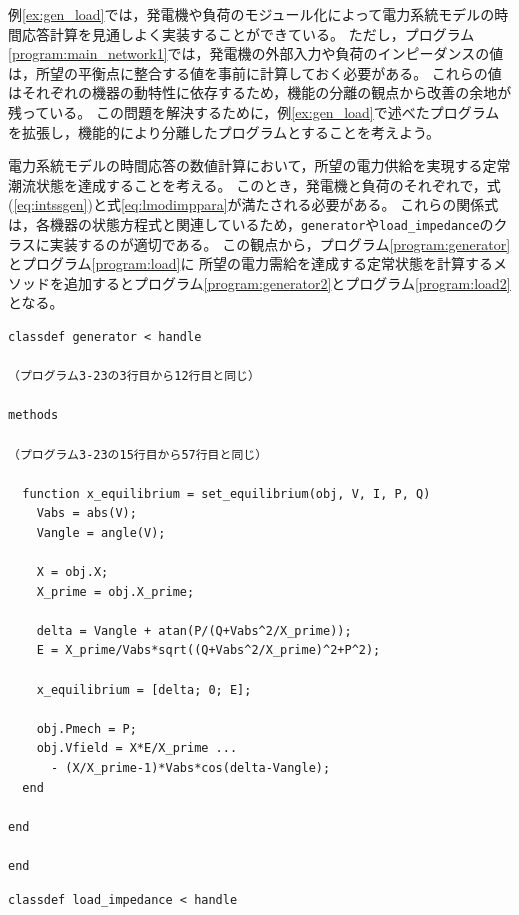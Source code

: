 \documentclass[tombow,dvipdfmx]{corona-a5-1.1}
\begin{document}
例\ref{ex:gen_load}では，発電機や負荷のモジュール化によって電力系統モデルの時間応答計算を見通しよく実装することができている。
ただし，プログラム\nobreak\ref{program:main_network1}では，発電機の外部入力や負荷のインピーダンスの値は，所望の平衡点に整合する値を事前に計算しておく必要がある。
これらの値はそれぞれの機器の動特性に依存するため，機能の分離の観点から改善の余地が残っている。
この問題を解決するために，例\ref{ex:gen_load}で述べたプログラムを拡張し，機能的により分離したプログラムとすることを考えよう。


\begin{例}[発電機や負荷の定常状態を計算するメソッドの追加]
電力系統モデルの時間応答の数値計算において，所望の電力供給を実現する定常潮流状態を達成することを考える。
このとき，発電機と負荷のそれぞれで，式(\ref{eq:intssgen})と式\ref{eq:lmodimppara}が満たされる必要がある。
これらの関係式は，各機器の状態方程式と関連しているため，\verb|generator|や\verb|load_impedance|のクラスに実装するのが適切である。
この観点から，プログラム\ref{program:generator}とプログラム\ref{program:load}に
所望の電力需給を達成する定常状態を計算するメソッドを追加するとプログラム\nobreak\ref{program:generator2}とプログラム\ref{program:load2}となる。

\smallskip
\begin{PROGRAMA}[count,title={generator.m}]\label{program:generator2}
  \begin{verbatim}
classdef generator < handle
  
（プログラム3-23の3行目から12行目と同じ）

methods

（プログラム3-23の15行目から57行目と同じ）

  function x_equilibrium = set_equilibrium(obj, V, I, P, Q)
    Vabs = abs(V);
    Vangle = angle(V);
    
    X = obj.X;
    X_prime = obj.X_prime;
    
    delta = Vangle + atan(P/(Q+Vabs^2/X_prime));
    E = X_prime/Vabs*sqrt((Q+Vabs^2/X_prime)^2+P^2);
    
    x_equilibrium = [delta; 0; E];
    
    obj.Pmech = P;
    obj.Vfield = X*E/X_prime ...
      - (X/X_prime-1)*Vabs*cos(delta-Vangle);
  end

end
  
end
\end{verbatim}
\end{PROGRAMA}

\smallskip
\begin{PROGRAMA}[count,title={load\_impedance.m}]\label{program:load2}
\begin{verbatim}
classdef load_impedance < handle
  

\end{verbatim}
\end{PROGRAMA}
\end{例}
\end{document}
